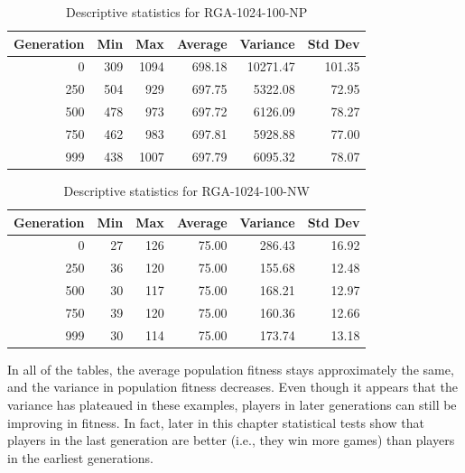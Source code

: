 \begin{table}[ht]
\begin{center}
\caption[RGA-1024-100-NP statistics]{Descriptive statistics for RGA-1024-100-NP}
\begin{tabular}{ | r || r | r | r | r | r |}
\hline
Generation & Min & Max & Average & Variance & Std Dev \\ \hline \hline
0   & 309 & 1094 & 698.18 &  10271.47 & 101.35 \\ \hline
250 & 504 &  929 & 697.75 &   5322.08 &  72.95 \\ \hline
500 & 478 &  973 & 697.72 &   6126.09 &  78.27 \\ \hline
750 & 462 &  983 & 697.81 &   5928.88 &  77.00 \\ \hline
999 & 438 & 1007 & 697.79 &   6095.32 &  78.07 \\ \hline
\end{tabular}
\label{table-stats-for-s1024-n100-np}
\end{center}
\end{table}

\begin{table}[ht]
\begin{center}
\caption[RGA-1024-100-NW statistics]{Descriptive statistics for RGA-1024-100-NW}
\begin{tabular}{ | r || r | r | r | r | r |}
\hline
Generation & Min & Max & Average & Variance & Std Dev \\ \hline \hline
0   & 27 & 126 & 75.00 & 286.43 & 16.92 \\ \hline
250 & 36 & 120 & 75.00 & 155.68 & 12.48 \\ \hline
500 & 30 & 117 & 75.00 & 168.21 & 12.97 \\ \hline
750 & 39 & 120 & 75.00 & 160.36 & 12.66 \\ \hline
999 & 30 & 114 & 75.00 & 173.74 & 13.18 \\ \hline
\end{tabular}
\label{table-stats-for-s1024-n100-nw}
\end{center}
\end{table}

In all of the tables, the average population fitness stays approximately
the same, and the variance in population fitness decreases. Even though it
appears that the variance has plateaued in these examples, players in later
generations can still be improving in fitness. In fact, 
later in this chapter statistical tests show that players in the last generation
are better (i.e., they win more games) than players in the earliest generations.

